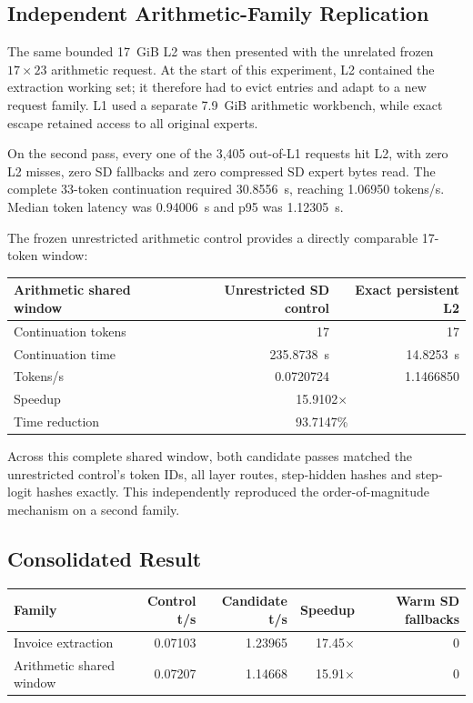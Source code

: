 \subsection{Independent Arithmetic-Family Replication}

The same bounded 17~GiB L2 was then presented with the unrelated frozen
$17\times23$ arithmetic request.  At the start of this experiment, L2 contained
the extraction working set; it therefore had to evict entries and adapt to a
new request family.  L1 used a separate 7.9~GiB arithmetic workbench, while
exact escape retained access to all original experts.

On the second pass, every one of the 3,405 out-of-L1 requests hit L2, with zero
L2 misses, zero SD fallbacks and zero compressed SD expert bytes read.  The
complete 33-token continuation required 30.8556~s, reaching 1.06950 tokens/s.
Median token latency was 0.94006~s and p95 was 1.12305~s.

The frozen unrestricted arithmetic control provides a directly comparable
17-token window:

\begin{center}
\begin{tabular}{@{}lrr@{}}
\toprule
Arithmetic shared window & Unrestricted SD control & Exact persistent L2 \\
\midrule
Continuation tokens & 17 & 17 \\
Continuation time & 235.8738~s & 14.8253~s \\
Tokens/s & 0.0720724 & 1.1466850 \\
Speedup & \multicolumn{2}{c}{15.9102$\times$} \\
Time reduction & \multicolumn{2}{c}{93.7147\%} \\
\bottomrule
\end{tabular}
\end{center}

Across this complete shared window, both candidate passes matched the
unrestricted control's token IDs, all layer routes, step-hidden hashes and
step-logit hashes exactly.  This independently reproduced the
order-of-magnitude mechanism on a second family.

\subsection{Consolidated Result}

\begin{center}
\begin{tabular}{@{}lrrrr@{}}
\toprule
Family & Control t/s & Candidate t/s & Speedup & Warm SD fallbacks \\
\midrule
Invoice extraction & 0.07103 & 1.23965 & 17.45$\times$ & 0 \\
Arithmetic shared window & 0.07207 & 1.14668 & 15.91$\times$ & 0 \\
\bottomrule
\end{tabular}
\end{center}

